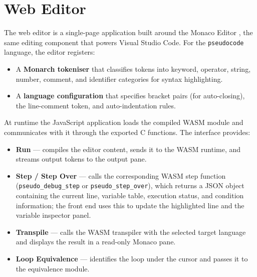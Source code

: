\section{Web Editor}
\label{sec:editor}

The web editor is a single-page application built around the Monaco Editor
\cite{monaco}, the same editing component that powers Visual Studio Code.
For the \texttt{pseudocode} language, the editor registers:

\begin{itemize}
  \item A \textbf{Monarch tokeniser} \cite{monarch} that classifies tokens
        into keyword, operator, string, number, comment, and identifier
        categories for syntax highlighting.
  \item A \textbf{language configuration} that specifies bracket pairs
        (for auto-closing), the line-comment token, and auto-indentation
        rules.
\end{itemize}

At runtime the JavaScript application loads the compiled WASM module and
communicates with it through the exported C functions.  The interface
provides:

\begin{itemize}
  \item \textbf{Run} --- compiles the editor content, sends it to the WASM
        runtime, and streams output tokens to the output pane.
  \item \textbf{Step / Step Over} --- calls the corresponding WASM step
        function (\texttt{pseudo\_debug\_step} or \texttt{pseudo\_step\_over}),
        which returns a JSON object containing the current line, variable table,
        execution status, and condition information; the front end uses this to
        update the highlighted line and the variable inspector panel.
  \item \textbf{Transpile} --- calls the WASM transpiler with the selected
        target language and displays the result in a read-only Monaco pane.
  \item \textbf{Loop Equivalence} --- identifies the loop under the cursor
        and passes it to the equivalence module.
\end{itemize}

